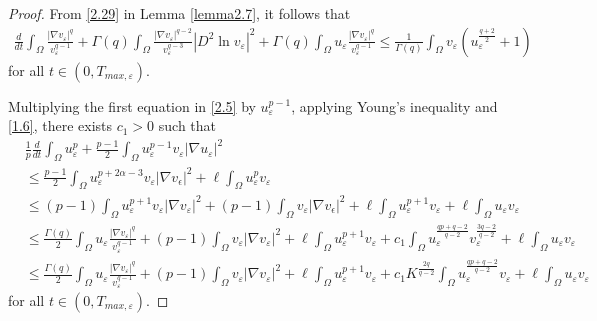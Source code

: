 \documentclass[10pt,a4paper]{amsart}
\begin{document}
\begin{proof}
From \eqref{2.29} in Lemma \ref{lemma2.7}, it follows that
    \begin{align}\label{3.31}
    \frac{d}{dt}\int_{\Omega}\frac{|\nabla v_{\varepsilon}|^q}{v_{\varepsilon}^{q-1}}+\Gamma(q)\int_{\Omega}\frac{|\nabla
    v_{\varepsilon}|^{q-2}}{v_{\varepsilon}^{q-3}}|D^2\ln{v_{\varepsilon}}|^2+\Gamma(q)\int_{\Omega}u_{\varepsilon}\frac{|\nabla
    v_{\varepsilon}|^q}{v_{\varepsilon}^{q-1}}\leq \frac{1}{\Gamma(q)}\int_{\Omega}v_{\varepsilon}(u_{\varepsilon}^{\frac{q+2}{2}}+1)
\end{align}
for all $t\in (0,T_{max,\varepsilon})$.

  Multiplying the first equation in \eqref{2.5} by $u_{\varepsilon}^{p-1}$, applying Young's inequality and \eqref{1.6}, there exists
  $c_1>0$ such that
    \begin{align}\label{3.32}
      &\frac{1}p \frac{d}{dt}\int_{\Omega}u_{\varepsilon}^{p}+\frac{p-1}{2}\int_{\Omega}u_{\varepsilon}^{p-1}v_{\varepsilon}|\nabla
      u_{\varepsilon}|^2\nonumber
      \\
      &\leq \frac{p-1}{2}\int_{\Omega}u_{\varepsilon}^{p+2\alpha-3}v_{\varepsilon}|\nabla
      v_{\epsilon}|^2+\ell\int_{\Omega}u_{\varepsilon}^pv_{\varepsilon}
      \\
      &\leq (p-1)\int_{\Omega}u_{\varepsilon}^{p+1}v_{\varepsilon}|\nabla v_{\varepsilon}|^2+(p-1)\int_{\Omega}v_{\varepsilon}|\nabla
      v_{\epsilon}|^2+\ell\int_{\Omega}u_{\varepsilon}^{p+1}v_{\varepsilon}+\ell\int_{\Omega}u_{\varepsilon}v_{\varepsilon}\nonumber
      \\
      &\leq  \frac{\Gamma(q)} 2
      \int_{\Omega}u_{\varepsilon}\frac{|\nabla v_{\varepsilon}|^q}{v_{\varepsilon}^{q-1}}+(p-1)\int_{\Omega}v_{\varepsilon}|\nabla
      v_{\varepsilon}|^2+\ell\int_{\Omega}u_{\varepsilon}^{p+1}v_{\varepsilon}+c_1\int_{\Omega}u_{\varepsilon}^{\frac{qp+q-2}{q-2}}v_{\varepsilon}^{\frac{3q-2}{q-2}}+\ell\int_{\Omega}u_{\varepsilon}v_{\varepsilon}\nonumber
      \\
      &\leq    \frac{\Gamma(q)} 2\int_{\Omega}u_{\varepsilon}\frac{|\nabla v_{\varepsilon}|^q}{v_{\varepsilon}^{q-1}}+(p-1)\int_{\Omega}v_{\varepsilon}|\nabla
      v_{\varepsilon}|^2+\ell\int_{\Omega}u_{\varepsilon}^{p+1}v_{\varepsilon}+
      c_1K^{\frac{2q}{q-2}}\int_{\Omega}u_{\varepsilon}^{\frac{qp+q-2}{q-2}}v_{\varepsilon}+
      \ell\int_{\Omega}u_{\varepsilon}v_{\varepsilon}\nonumber
    \end{align}
    for all $t\in (0,T_{max,\varepsilon})$.


\end{proof}
\end{document}
